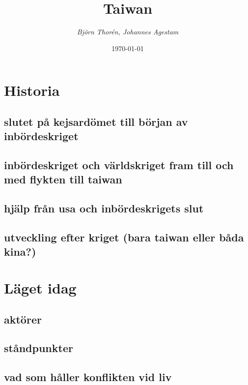 \documentclass[a4paper,10pt]{article}
\title{\Huge\bf{Taiwan}\\}
\author{\emph{Björn Thorén, Johannes Agestam}}
\date{\today}
\begin{document}
\null  %
\nointerlineskip  %
\vfill
\let\snewpage \newpage
\let\newpage \relax
\maketitle
\let \newpage \snewpage
\vfill 
\break %

\newpage


\section{Historia}

\subsection{slutet på kejsardömet till början av inbördeskriget}

\subsection{inbördeskriget och världskriget fram till och med flykten till taiwan}

\subsection{hjälp från usa och inbördeskrigets slut}

\subsection{utveckling efter kriget (bara taiwan eller båda kina?)}


\section{Läget idag}

\subsection{aktörer}

\subsection{ståndpunkter}

\subsection{vad som håller konflikten vid liv}
\end{document}
